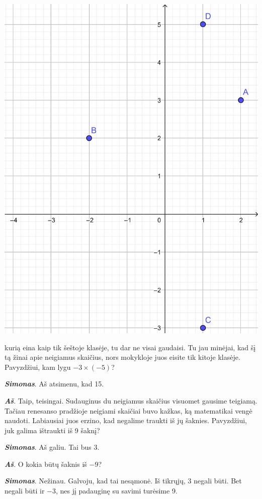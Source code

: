 \documentclass[a4paper]{article}
\newcommand{\say}[1]{\textbf{\textit{#1}}}
\begin{document}
\begin{minipage}[b]{0.3\textwidth}
\includegraphics[width=\textwidth]{taskai.png}
\end{minipage}
kurią eina kaip tik šeštoje klasėje, tu dar ne visai gaudaisi. Tu jau minėjai, kad šį tą žinai apie neigiamus skaičius, nors mokykloje juos eisite tik kitoje klasėje. Pavyzdžiui, kam lygu $-3 \times (-5)$? 

\say{Simonas}. Aš atsimenu, kad 15.

\say{Aš}. Taip, teisingai. Sudauginus du neigiamus skaičius visuomet gausime teigiamą. Tačiau renesanso pradžioje neigiami skaičiai buvo kažkas, ką matematikai vengė naudoti. Labiausiai juos erzino, kad negalime traukti iš jų šaknies. Pavyzdžiui, juk galima ištraukti iš 9 šaknį?

\say{Simonas}. Aš galiu. Tai bus 3.

\say{Aš}. O kokia būtų šaknis iš $-9$?

\say{Simonas}. Nežinau. Galvoju, kad tai nesąmonė. Iš tikrųjų, 3 negali būti. Bet negali būti ir $-3$, nes jį padauginę su savimi turėsime 9.
\end{document}

